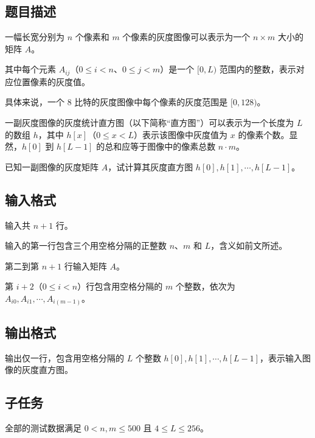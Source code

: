 \subsection*{题目描述}

一幅长宽分别为 $n$ 个像素和 $m$ 个像素的灰度图像可以表示为一个 $n \times m$ 大小的矩阵 $A$。

其中每个元素 $A_{ij}$（$0 \le i <n$、$0 \le j < m$）是一个 $[0, L)$ 范围内的整数，表示对应位置像素的灰度值。

具体来说，一个 $8$ 比特的灰度图像中每个像素的灰度范围是 $[0, 128)$。

一副灰度图像的灰度统计直方图（以下简称“直方图”）可以表示为一个长度为 $L$ 的数组 $h$，其中 $h[x]$（$0 \le x < L$）表示该图像中灰度值为 $x$ 的像素个数。显然，$h[0]$ 到 $h[L-1]$ 的总和应等于图像中的像素总数 $n \cdot m$。

已知一副图像的灰度矩阵 $A$，试计算其灰度直方图 $h[0], h[1], \cdots, h[L-1]$。


\subsection*{输入格式}

输入共 $n + 1$ 行。

输入的第一行包含三个用空格分隔的正整数 $n$、$m$ 和 $L$，含义如前文所述。

第二到第 $n + 1$ 行输入矩阵 $A$。

第 $i + 2$（$0 \le i < n$）行包含用空格分隔的 $m$ 个整数，依次为 $A_{i0}, A_{i1}, \cdots, A_{i(m-1)}$。


\subsection*{输出格式}

输出仅一行，包含用空格分隔的 $L$ 个整数 $h[0], h[1], \cdots, h[L-1]$，表示输入图像的灰度直方图。

\examplebox{}{}

\examplebox{}{}

\subsection*{子任务}

全部的测试数据满足 $0 < n, m \le 500$ 且 $4 \le L \le 256$。


